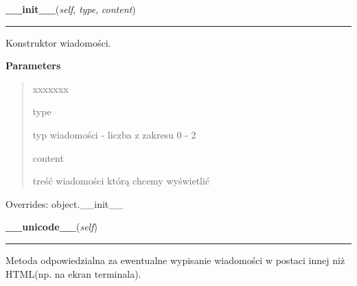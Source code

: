 \hspace{.8\funcindent}\begin{boxedminipage}{\funcwidth}

    \raggedright \textbf{\_\_init\_\_}(\textit{self}, \textit{type}, \textit{content})

    \vspace{-1.5ex}

    \rule{\textwidth}{0.5\fboxrule}
\setlength{\parskip}{2ex}
    Konstruktor wiadomości.

\setlength{\parskip}{1ex}
      \textbf{Parameters}
      \vspace{-1ex}

      \begin{quote}
        \begin{Ventry}{xxxxxxx}

          \item[type]

          typ wiadomości - liczba z zakresu 0 - 2

          \item[content]

          treść wiadomości którą chcemy wyświetlić

        \end{Ventry}

      \end{quote}

      Overrides: object.\_\_init\_\_

    \end{boxedminipage}

    \label{ass8_portal:accounts:views:Message:__unicode__}

    \vspace{0.5ex}

\hspace{.8\funcindent}\begin{boxedminipage}{\funcwidth}

    \raggedright \textbf{\_\_unicode\_\_}(\textit{self})

    \vspace{-1.5ex}

    \rule{\textwidth}{0.5\fboxrule}
\setlength{\parskip}{2ex}
    Metoda odpowiedzialna za ewentualne wypisanie wiadomości w postaci 
    innej niż HTML(np. na ekran terminala).

\setlength{\parskip}{1ex}
    \end{boxedminipage}


